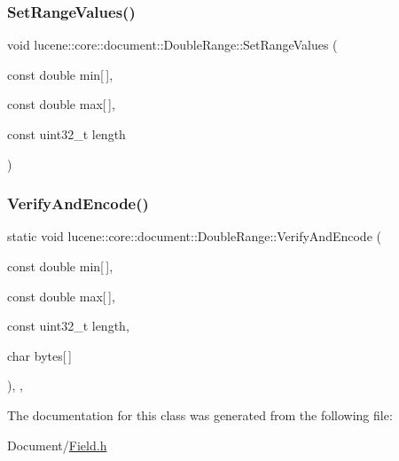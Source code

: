 \subsubsection{\texorpdfstring{Set\+Range\+Values()}{SetRangeValues()}}
{\footnotesize\ttfamily void lucene\+::core\+::document\+::\+Double\+Range\+::\+Set\+Range\+Values (\begin{DoxyParamCaption}\item[{const double}]{min\mbox{[}$\,$\mbox{]},  }\item[{const double}]{max\mbox{[}$\,$\mbox{]},  }\item[{const uint32\+\_\+t}]{length }\end{DoxyParamCaption})\hspace{0.3cm}{\ttfamily [inline]}}

\mbox{\label{classlucene_1_1core_1_1document_1_1DoubleRange_a2171d66292b3437034c90c68baaa08db}} 
\subsubsection{\texorpdfstring{Verify\+And\+Encode()}{VerifyAndEncode()}}
{\footnotesize\ttfamily static void lucene\+::core\+::document\+::\+Double\+Range\+::\+Verify\+And\+Encode (\begin{DoxyParamCaption}\item[{const double}]{min\mbox{[}$\,$\mbox{]},  }\item[{const double}]{max\mbox{[}$\,$\mbox{]},  }\item[{const uint32\+\_\+t}]{length,  }\item[{char}]{bytes\mbox{[}$\,$\mbox{]} }\end{DoxyParamCaption})\hspace{0.3cm}{\ttfamily [inline]}, {\ttfamily [static]}, {\ttfamily [private]}}



The documentation for this class was generated from the following file\+:\begin{DoxyCompactItemize}
\item 
Document/\mbox{\hyperlink{Document_2Field_8h}{Field.\+h}}\end{DoxyCompactItemize}
